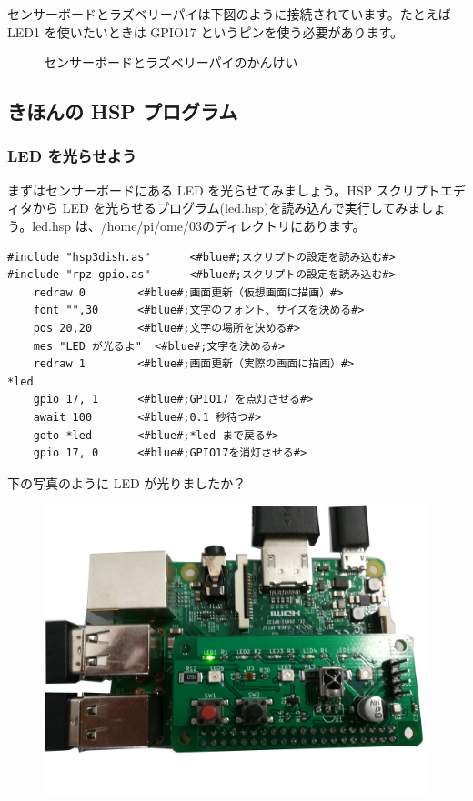 センサーボードとラズベリーパイは下図のように接続されています。たとえば LED1 を使いたいときは GPIO17 というピンを使う必要があります。

\begin{figure}[H]
    \centering
    
    \caption{センサーボードとラズベリーパイのかんけい}
\end{figure}

\subsection{きほんの HSP プログラム}
\subsubsection{LED を光らせよう}

まずはセンサーボードにある LED を光らせてみましょう。HSP スクリプトエディタから LED を光らせるプログラム(led.hsp)を読み込んで実行してみましょう。led.hsp は、/home/pi/ome/03のディレクトリにあります。\\

\begin{lstlisting}[caption=led.hsp,label=led.hsp]
#include "hsp3dish.as"		<#blue#;スクリプトの設定を読み込む#>
#include "rpz-gpio.as"		<#blue#;スクリプトの設定を読み込む#>
	redraw 0		<#blue#;画面更新（仮想画面に描画）#>
	font "",30		<#blue#;文字のフォント、サイズを決める#>
	pos 20,20		<#blue#;文字の場所を決める#>
	mes "LED が光るよ"	<#blue#;文字を決める#>
	redraw 1		<#blue#;画面更新（実際の画面に描画）#>
*led
	gpio 17, 1		<#blue#;GPIO17 を点灯させる#>
	await 100		<#blue#;0.1 秒待つ#>
	goto *led		<#blue#;*led まで戻る#>
	gpio 17, 0		<#blue#;GPIO17を消灯させる#>
\end{lstlisting}

下の写真のように LED が光りましたか？\\

\begin{figure}[H]
    \centering
    \includegraphics[width=\linewidth]{images/chap03/text03-img032.jpg}
\end{figure}

